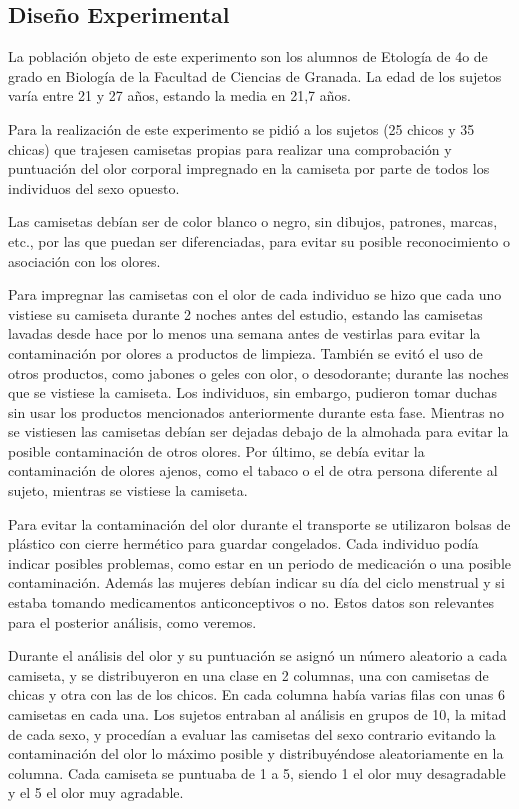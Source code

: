 \documentclass[fleqn,10pt]{SelfArx} %
\begin{document}
\subsection{Diseño Experimental}

La población objeto de este experimento son los alumnos de Etología de 4o de grado en Biología de la Facultad de Ciencias de Granada. La edad de los sujetos varía entre 21 y 27 años, estando la media en 21,7 años.

Para la realización de este experimento se pidió a los sujetos (25 chicos y 35 chicas) que trajesen camisetas propias para realizar una comprobación y puntuación del olor corporal impregnado en la camiseta por parte de todos los individuos del sexo opuesto.

Las camisetas debían ser de color blanco o negro, sin dibujos, patrones, marcas, etc., por las que puedan ser diferenciadas, para evitar su posible reconocimiento o asociación con los olores.

Para impregnar las camisetas con el olor de cada individuo se hizo que cada uno vistiese su camiseta durante 2 noches antes del estudio, estando las camisetas lavadas desde hace por lo menos una semana antes de vestirlas para evitar la contaminación por olores a productos de limpieza. También se evitó el uso de otros productos, como jabones o geles con olor, o desodorante; durante las noches que se vistiese la camiseta. Los individuos, sin embargo, pudieron tomar duchas sin usar los productos mencionados anteriormente durante esta fase. Mientras no se vistiesen las camisetas debían ser dejadas debajo de la almohada para evitar la posible contaminación de otros olores. Por último, se debía evitar la contaminación de olores ajenos, como el tabaco o el de otra persona diferente al sujeto, mientras se vistiese la camiseta.

Para evitar la contaminación del olor durante el transporte se utilizaron bolsas de plástico con cierre hermético para guardar congelados. Cada individuo podía indicar posibles problemas, como estar en un periodo de medicación o una posible contaminación. Además las mujeres debían indicar su día del ciclo menstrual y si estaba tomando medicamentos anticonceptivos o no. Estos datos son relevantes para el posterior análisis, como veremos.

Durante el análisis del olor y su puntuación se asignó un número aleatorio a cada camiseta, y se distribuyeron en una clase en 2 columnas, una con camisetas de chicas y otra con las de los chicos. En cada columna había varias filas con unas 6 camisetas en cada una. Los sujetos entraban al análisis en grupos de 10, la mitad de cada sexo, y procedían a evaluar las camisetas del sexo contrario evitando la contaminación del olor lo máximo posible y distribuyéndose aleatoriamente en la columna. Cada camiseta se puntuaba de 1 a 5, siendo 1 el olor muy desagradable y el 5 el olor muy agradable.
\end{document}
